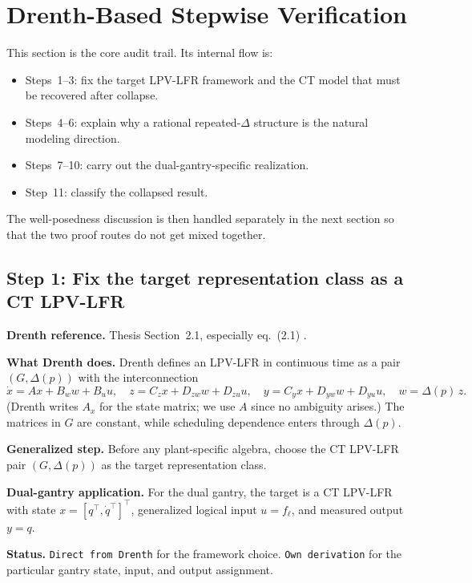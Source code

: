 \documentclass[11pt]{article}
\newcommand{\audititem}[2]{\par\smallskip\noindent\textbf{#1.} #2\par}
\newcommand{\statusline}[1]{\texttt{#1}}
\begin{document}
\section{Drenth-Based Stepwise Verification}

This section is the core audit trail. Its internal flow is:
\begin{itemize}[leftmargin=1.2em]
    \item Steps~1--3: fix the target LPV-LFR framework and the CT model that
    must be recovered after collapse.
    \item Steps~4--6: explain why a rational repeated-$\Delta$ structure is the
    natural modeling direction.
    \item Steps~7--10: carry out the dual-gantry-specific realization.
    \item Step~11: classify the collapsed result.
\end{itemize}
The well-posedness discussion is then handled separately in the next section so
that the two proof routes do not get mixed together.

\subsection{Step 1: Fix the target representation class as a CT LPV-LFR}

\audititem{Drenth reference}{Thesis Section~2.1, especially eq.~(2.1)
\cite{drenth2025thesis}.}

\audititem{What Drenth does}{Drenth defines an LPV-LFR in continuous time as a
pair $(G,\Delta(p))$ with the interconnection
\[
\dot{x} = A x + B_w w + B_u u,\quad
z = C_z x + D_{zw} w + D_{zu} u,\quad
y = C_y x + D_{yw} w + D_{yu} u,\quad
w = \Delta(p)\,z.
\]
(Drenth writes $A_x$ for the state matrix; we use $A$ since no ambiguity arises.)
The matrices in $G$ are constant, while scheduling dependence enters through
$\Delta(p)$.}

\audititem{Generalized step}{Before any plant-specific algebra, choose the CT
LPV-LFR pair $(G,\Delta(p))$ as the target representation class.}

\audititem{Dual-gantry application}{For the dual gantry, the target is a CT
LPV-LFR with state $x = [q^\top,\dot{q}^\top]^\top$, generalized logical input
$u = f_\ell$, and measured output $y = q$.}

\audititem{Status}{\statusline{Direct from Drenth} for the framework choice.
\statusline{Own derivation} for the particular gantry state, input, and output
assignment.}
\end{document}
